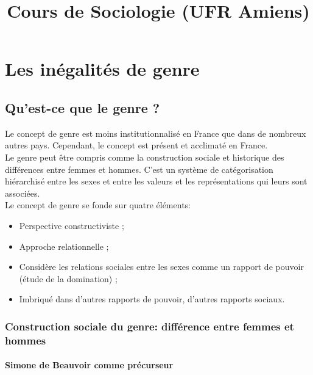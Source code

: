 \documentclass[12pt, a4paper, openany]{book}
\date{}
\title{Cours de Sociologie (UFR Amiens)}
\begin{document}
\part{Les inégalités de genre}

\chapter{Qu'est-ce que le genre ?}

Le concept de genre est moins institutionnalisé en France que dans de nombreux autres pays. Cependant, le concept est présent et acclimaté en France. \\
Le genre peut être compris comme la construction sociale et historique des différences entre femmes et hommes. C'est un système de catégorisation hiérarchisé entre les sexes et entre les valeurs et les représentations qui leurs sont associées. \\ 
Le concept de genre se fonde sur quatre éléments:
\begin{itemize}
\item Perspective constructiviste ;
\item Approche relationnelle ;
\item Considère les relations sociales entre les sexes comme un rapport de pouvoir (étude de la domination) ;
\item Imbriqué dans d'autres rapports de pouvoir, d'autres rapports sociaux.
\end{itemize}

\section{Construction sociale du genre: différence entre femmes et hommes}

\subsection{Simone de Beauvoir comme précurseur}
\end{document}
